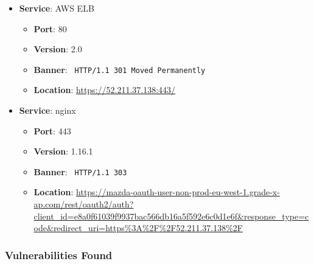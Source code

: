 \documentclass{article}
\begin{document}
\begin{itemize}
    
        \item \textbf{Service}: AWS ELB
        \begin{itemize}
            \item \textbf{Port}: 80
            \item \textbf{Version}:  2.0 
            \item \textbf{Banner}: \texttt{
                HTTP/1.1 301 Moved Permanently
            }
            \item \textbf{Location}: \href{ https://52.211.37.138:443/ }{ https://52.211.37.138:443/ }
        \end{itemize}
    
        \item \textbf{Service}: nginx
        \begin{itemize}
            \item \textbf{Port}: 443
            \item \textbf{Version}:  1.16.1 
            \item \textbf{Banner}: \texttt{
                HTTP/1.1 303 
            }
            \item \textbf{Location}: \href{ https://mazda-oauth-user-non-prod-eu-west-1.grade-x-ap.com/rest/oauth2/auth?client\_id=e8a0f61039f9937bac566db16a5f592e6c0d1e6f\&response\_type=code\&redirect\_uri=https\%3A\%2F\%2F52.211.37.138\%2F }{ https://mazda-oauth-user-non-prod-eu-west-1.grade-x-ap.com/rest/oauth2/auth?client\_id=e8a0f61039f9937bac566db16a5f592e6c0d1e6f\&response\_type=code\&redirect\_uri=https\%3A\%2F\%2F52.211.37.138\%2F }
        \end{itemize}
    
\end{itemize}


\subsubsection*{Vulnerabilities Found}
\end{document}
